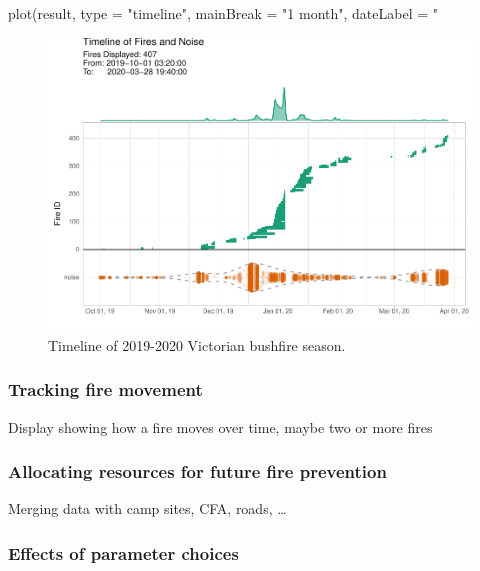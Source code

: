 \begin{Schunk}
\begin{Sinput}
plot(result, type = "timeline", mainBreak = "1 month", dateLabel = "%
\end{Sinput}
\begin{figure}

{\centering \includegraphics[width=0.8\linewidth]{clustering_paper_files/figure-latex/himtimeline-1} 

}

\caption[Timeline of 2019-2020 Victorian bushfire season]{Timeline of 2019-2020 Victorian bushfire season.}\label{fig:himtimeline}
\end{figure}
\end{Schunk}

\hypertarget{tracking-fire-movement}{%
\subsubsection{Tracking fire movement}\label{tracking-fire-movement}}

Display showing how a fire moves over time, maybe two or more fires

\hypertarget{allocating-resources-for-future-fire-prevention}{%
\subsubsection{Allocating resources for future fire
prevention}\label{allocating-resources-for-future-fire-prevention}}

Merging data with camp sites, CFA, roads, \ldots{}

\hypertarget{effects-of-parameter-choices}{%
\subsubsection{Effects of parameter
choices}\label{effects-of-parameter-choices}}

